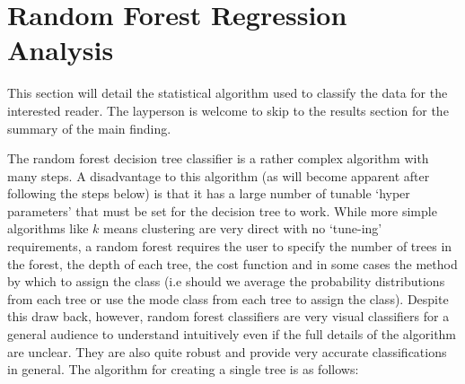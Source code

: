 \documentclass[10pt]{article}
\begin{document}
\section{Random Forest Regression Analysis}
\label{sec_rf}
This section will detail the statistical algorithm used to classify the data for the interested reader. The layperson is welcome to skip to the results section for the summary of the main finding.

The random forest decision tree classifier is a rather complex algorithm with many steps. A disadvantage to this algorithm (as will become apparent after following the steps below) is that it has a large number of tunable `hyper parameters' that must be set for the decision tree to work. While more simple algorithms like $k$ means clustering are very direct with no `tune-ing' requirements, a random forest requires the user to specify the number of trees in the forest, the depth of each tree, the cost function and in some cases the method by which to assign the class (i.e should we average the probability distributions from each tree or use the mode class from each tree to assign the class). Despite this draw back, however, random forest classifiers are very visual classifiers for a general audience to understand intuitively even if the full details of the algorithm are unclear. They are also quite robust and provide very accurate classifications in general. The algorithm for creating a single tree is as follows:
\end{document}
